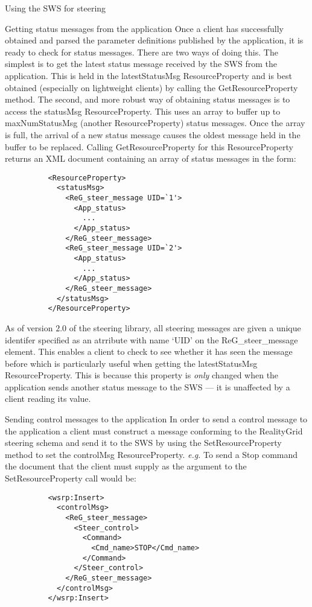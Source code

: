 \documentclass[a4paper]{article}
\begin{document}
\begin{section}{Using the SWS for steering}
\begin{subsection}{Getting status messages from the application}
Once a client has successfully obtained and parsed the parameter
definitions published by the application, it is ready to check for
status messages.  There are two ways of doing this.  The simplest is
to get the latest status message received by the SWS from the
application.  This is held in the latestStatusMsg ResourceProperty and
is best obtained (especially on lightweight clients) by calling the
GetResourceProperty method.  The second, and more robust way of
obtaining status messages is to access the statusMsg ResourceProperty.
This uses an array to buffer up to maxNumStatusMsg (another
ResourceProperty) status messages.  Once the array is full, the
arrival of a new status message causes the oldest message held in the
buffer to be replaced.  Calling GetResourceProperty for this
ResourceProperty returns an XML document containing an array of status
messages in the form:
\begin{verbatim}
          <ResourceProperty>
            <statusMsg>
              <ReG_steer_message UID=`1'>
                <App_status>
                  ...
                </App_status>
              </ReG_steer_message>
              <ReG_steer_message UID=`2'>
                <App_status>
                  ...
                </App_status>
              </ReG_steer_message>
            </statusMsg>
          </ResourceProperty>
\end{verbatim}

As of version $2.0$ of the steering library, all steering messages are
given a unique identifer specified as an atrribute with name `UID' on
the ReG\_steer\_message element.  This enables a client to check to see
whether it has seen the message before which is particularly useful
when getting the latestStatusMsg ResourceProperty.  This is because
this property is {\em only} changed when the application sends another
status message to the SWS --- it is unaffected by a client reading its
value.
\end{subsection}

\begin{subsection}{Sending control messages to the application}
In order to send a control message to the application a client must
construct a message conforming to the RealityGrid steering schema and
send it to the SWS by using the SetResourceProperty method to set the
controlMsg ResourceProperty. {\it e.g.} To send a Stop command the document
that the client must supply as the argument to the SetResourceProperty
call would be:
\begin{verbatim}
          <wsrp:Insert>
            <controlMsg>
              <ReG_steer_message>
                <Steer_control>
                  <Command>
                    <Cmd_name>STOP</Cmd_name>
                  </Command>
                </Steer_control>
              </ReG_steer_message>
            </controlMsg>
          </wsrp:Insert>
\end{verbatim}
\end{subsection}


\end{section}
\end{document}
